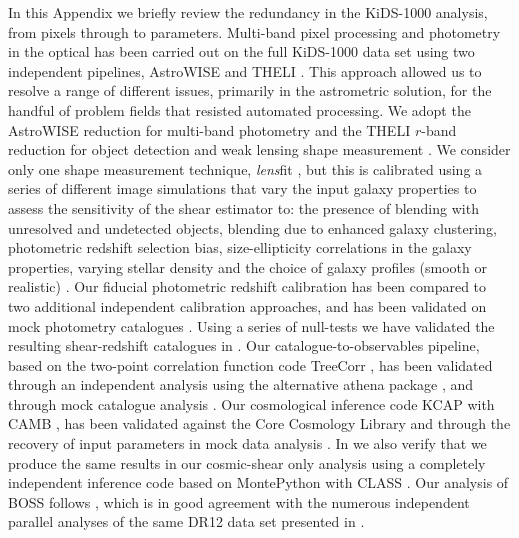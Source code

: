 \begin{appendix}
In this Appendix we briefly review the redundancy in the KiDS-1000 analysis, from pixels through to parameters.   Multi-band pixel processing and photometry in the optical has been carried out on the full KiDS-1000 data set using two independent pipelines, {\sc AstroWISE} and {\sc THELI} \citep{begeman/etal:2013, erben/etal:2013}.  This approach allowed us to resolve a range of different issues, primarily in the astrometric solution, for the handful of problem fields that resisted automated processing.  We adopt the {\sc AstroWISE} reduction for multi-band photometry and the {\sc THELI} $r$-band reduction for object detection and weak lensing shape measurement \citep{kuijken/etal:2019}.  We consider only one shape measurement technique, {\it lens}fit \citep{miller/etal:2013}, but this is calibrated using a series of different image simulations that vary the input galaxy properties to assess the sensitivity of the shear estimator to: the presence of blending with unresolved and undetected objects, blending due to enhanced galaxy clustering, photometric redshift selection bias, size-ellipticity correlations in the galaxy properties,  varying stellar density and the choice of galaxy profiles (smooth or realistic) \citep[see][for details]{kannawadi/etal:2019, giblin/etal:inprep}.  Our fiducial photometric redshift calibration has been compared to two additional independent calibration approaches, and has been validated on mock photometry catalogues \citep[see][for details]{wright/etal:2020, vandenbusch/etal:2020, hildebrandt/etal:inprep}.   Using a series of null-tests we have validated the resulting shear-redshift catalogues in \citet{giblin/etal:inprep}.    Our catalogue-to-observables pipeline, based on the two-point correlation function code {\sc TreeCorr} \citep{treecorr}, has been validated through an independent analysis using the alternative {\sc athena} package \citep{athena}, and through mock catalogue analysis \citep{joachimi/etal:inprep}.   Our cosmological inference code {\sc KCAP} with {\sc CAMB} \citep{lewis/etal:2000}, has been validated against the Core Cosmology Library \citep[CCL,][]{chisari/etal:2019} and through the recovery of input parameters in mock data analysis \citep{joachimi/etal:inprep}.  In \citet{asgari/etal:inprep} we also verify that we produce the same results in our cosmic-shear only analysis using a completely independent inference code based on {\sc MontePython} with {\sc CLASS} \citep{class, montepython, kohlinger/etal:2019,hildebrandt/etal:2020}.   Our analysis of BOSS follows \citet{sanchez/etal:2017}, which is in good agreement with the numerous independent parallel analyses of the same DR12 data set presented in \citet{alam/etal:2017}.


\end{appendix}
